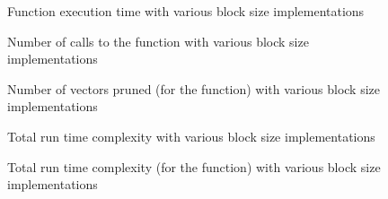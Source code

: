 \begin{figure}
    \centering
    
    \caption{Function execution time with various block size implementations}
    \label{profiling:blockSize:functionExecutionTime}
\end{figure}

\begin{figure}
    \centering
    
    \caption{Number of calls to the  function with various
        block size implementations}
    \label{profiling:blockSize:distanceCalls}
\end{figure}

\begin{figure}
    \centering
    
    \caption[Number of vectors pruned with various block size implementations]{
        Number of vectors pruned (for the 
        function) with various block size implementations}
    \label{profiling:blockSize:vectorsPruned}
\end{figure}

\begin{figure}
    \centering
    \begin{minipage}{\textwidth}
        \centering
        
        \caption{Total run time complexity with various block size
            implementations}
        \label{profiling:blockSize:totalRunTimeComplexity:linear}
    \end{minipage}
    \begin{minipage}{\textwidth}
        \centering
        
        \caption[Total run time complexity with various block size
            implementations]{Total run time complexity (for the
             function) with various block
            size implementations}
        \label{profiling:blockSize:totalRunTimeComplexity:logarithmic}
    \end{minipage}
\end{figure}

